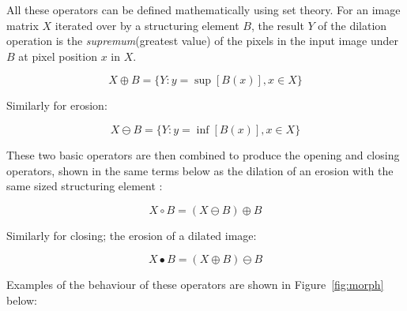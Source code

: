 \documentclass[a4paper,12pt,notitlepage]{article}
\begin{document}
			All these operators can be defined mathematically using set theory. For an image matrix $X$ iterated over by a structuring element $B$, the result $Y$ of the dilation operation is the \emph{supremum}(greatest value) of the pixels in the input image under $B$ at pixel position $x$ in $X$.

			\begin{equation}
				X \oplus B = \{ Y \colon y = \sup⁡[B(x)], x \in X \}
			\end{equation}

			Similarly for erosion:

			\begin{equation}
				X \ominus B = \{ Y \colon y = \inf[B(x)], x \in X \}
			\end{equation}

			These two basic operators are then combined to produce the opening and closing operators, shown in the same terms below as the dilation of an erosion with the same sized structuring element \autocite{sonka1999image2}:

			\begin{equation}
				X \circ B = ( X \ominus B ) \oplus B
			\end{equation}

			Similarly for closing; the erosion of a dilated image:

			\begin{equation}
				X \bullet B = ( X \oplus B ) \ominus B
			\end{equation}

			Examples of the behaviour of these operators are shown in Figure~\ref{fig:morph} below:
\end{document}
